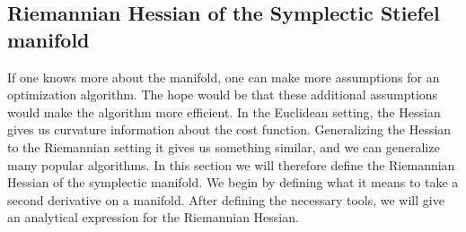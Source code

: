 \subsection{Riemannian Hessian of the Symplectic Stiefel manifold}
If one knows more about the manifold, one can make more assumptions for an optimization algorithm. The hope would be that these additional assumptions would make the algorithm more efficient. In the Euclidean setting, the Hessian gives us curvature information about the cost function. Generalizing the Hessian to the Riemannian setting it gives us something similar, and we can generalize many popular algorithms. In this section we will therefore define the Riemannian Hessian of the symplectic manifold. We begin by defining what it means to take a second derivative on a manifold. After defining the necessary tools, we will give an analytical expression for the Riemannian Hessian. 

